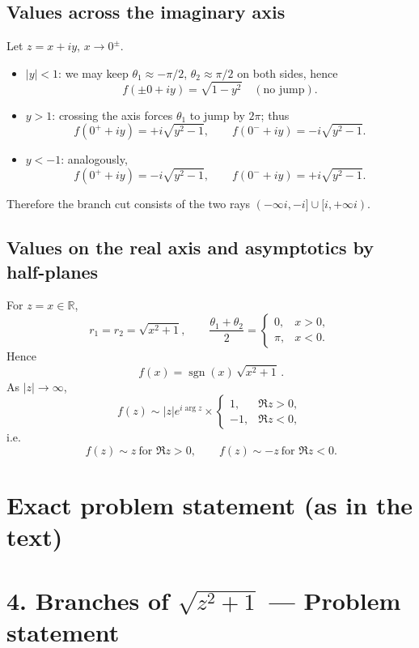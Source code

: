 \documentclass[11pt]{article}
\begin{document}
	\subsection*{Values across the imaginary axis}
	Let \(z=x+iy\), \(x\to0^\pm\).
	\begin{itemize}
		\item \(|y|<1\): we may keep \(\theta_1\approx -\pi/2\), \(\theta_2\approx \pi/2\) on both sides, hence
		\[
		f(\pm0{+}iy)=\sqrt{1-y^2}\quad(\text{no jump}).
		\]
		\item \(y>1\): crossing the axis forces \(\theta_1\) to jump by \(2\pi\); thus
		\[
		f(0^+{+}iy)=+i\sqrt{y^2-1},\qquad f(0^-{+}iy)=-i\sqrt{y^2-1}.
		\]
		\item \(y<-1\): analogously,
		\[
		f(0^+{+}iy)=-i\sqrt{y^2-1},\qquad f(0^-{+}iy)=+i\sqrt{y^2-1}.
		\]
	\end{itemize}
	Therefore the branch cut consists of the two rays \((-\infty i,-i]\cup[i,+\infty i)\).
	
	\subsection*{Values on the real axis and asymptotics by half-planes}
	For \(z=x\in\mathbb R\),
	\[
	r_1=r_2=\sqrt{x^2+1},\qquad
	\frac{\theta_1+\theta_2}{2}=\begin{cases}0,&x>0,\\ \pi,&x<0.\end{cases}
	\]
	Hence
	\[
	\boxed{\,f(x)=\operatorname{sgn}(x)\,\sqrt{x^2+1}\, }.
	\]
	As \(|z|\to\infty\),
	\[
	f(z)\sim |z|e^{i\arg z}\times
	\begin{cases}1,& \Re z>0,\\ -1,& \Re z<0,\end{cases}
	\]
	i.e.
	\[
	\boxed{\,f(z)\sim z\ \text{for }\Re z>0,\qquad f(z)\sim -z\ \text{for }\Re z<0.}
	\]
	
	
	\section*{Exact problem statement (as in the text)}
	
\section*{4.\; Branches of \(\sqrt{z^{2}+1}\) — Problem statement}
\end{document}

